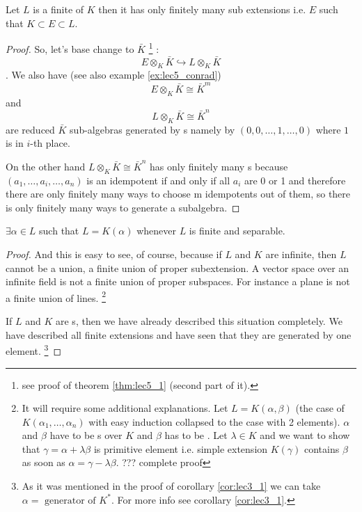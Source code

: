 \begin{theorem}
  Let $L$ is a finite  of $K$ then it
  has only finitely many sub extensions i.e. $E$ such that $K \subset
  E \subset L$.
  \begin{proof}
    So, let's base change to $\bar{K}$
    \footnote {
      see proof of theorem \ref{thm:lec5_1} (second part of it).
    }  
    :
    \[
    E \otimes_{K} \bar{K} \hookrightarrow
    L \otimes_{K} \bar{K}
    \].
    We also have (see also example \ref{ex:lec5_conrad})
    \[
    E \otimes_{K} \bar{K} \cong \bar{K}^m
    \]
    and
    \[
    L \otimes_{K} \bar{K} \cong \bar{K}^n
    \]
    are reduced $\bar{K}$ sub-algebras generated by
    s namely by
    $\left(0,0, \dots, 1, \dots, 0\right)$ where $1$ is in $i$-th
    place.

    On the other hand $L \otimes_K \bar{K} \cong \bar{K}^n$ has only
    finitely many s because 
    $\left(a_1, \dots, a_i, \dots, a_n\right)$ is an idempotent if and
    only if all $a_i$ are 0 or 1 and therefore there
    are only finitely many ways to choose m idempotents out of them,
    so there is only finitely many ways to generate a subalgebra.  
  \end{proof}
  \label{thm:primitiveelement}
\end{theorem}

\begin{corollary}
  $\exists \alpha \in L$ such that $L = K\left( \alpha \right)$
  whenever $L$ is finite and separable.
  \begin{proof}
    And this is easy to see, of course, because
    if $L$ and $K$ are infinite, then 
    $L$ cannot be a union, a finite union of proper subextension. 
    A vector space over an infinite field is not a finite union of
    proper subspaces.   For instance a plane is not a finite union of
    lines.
    \footnote{
      It will require some additional explanations. Let
      \cite{bib:KenBrownPrimitiveElementTheorem}
      $L = K\left(\alpha, \beta\right)$ (the case of
      $K\left(\alpha_1, \dots, \alpha_n\right)$ with easy induction
      collapsed to the case with 2 elements). $\alpha$ and $\beta$
      have to be s over $K$ and $\beta$
      has to be . Let $\lambda \in K$ and we
      want to show that $\gamma = \alpha + \lambda \beta$ is primitive
      element i.e. simple extension $K\left(\gamma\right)$ contains
      $\beta$ as soon as $\alpha = \gamma - \lambda \beta$.
      ??? complete proof
    }
    
    If $L$ and $K$ are s, then we have
    already described this situation completely. We have described all
    finite extensions and have seen that they are generated by one element.
    \footnote{
      As it was mentioned in the proof of corollary \ref{cor:lec3_1}
      we can take $\alpha = \mbox{ generator of } K^*$. For more info
      see corollary \ref{cor:lec3_1}.
    }
  \end{proof}
  \label{col:primitiveelement}
\end{corollary}

